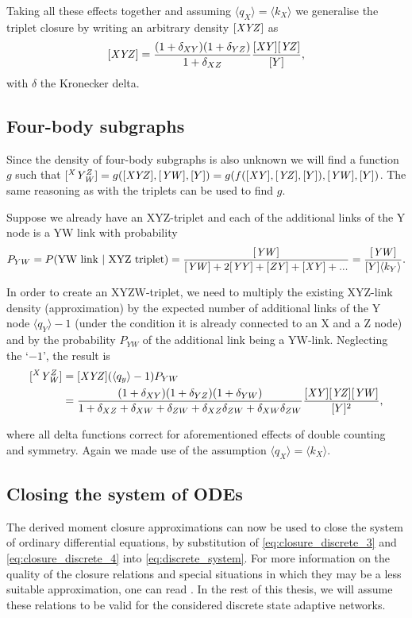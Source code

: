 Taking all these effects together and assuming $\langle q_X \rangle=\langle k_X \rangle$ we generalise the triplet closure by writing an arbitrary density $\mathit{[XYZ]}$ as 
\begin{equation}
	\mathit{[XYZ]} = \frac{(1+\delta_{XY})(1+\delta_{YZ})}{1+\delta_{XZ}} \frac{\mathit{[XY]}\mathit{[YZ]}}{[Y]},
	\label{eq:closure_discrete_3}
\end{equation}
with $\delta$ the Kronecker delta.

\subsection{Four-body subgraphs}
Since the density of four-body subgraphs is also unknown we will find a function $g$ such that $\mathit{[^XY^Z_W]} = g(\mathit{[XYZ]}, \mathit{[YW]}, [Y])= g(f(\mathit{[XY]}, \mathit{[YZ]}, [Y]), \mathit{[YW]}, [Y])$. The same reasoning as with the triplets can be used to find $g$.

Suppose we already have an XYZ-triplet and each of the additional links of the Y node is a YW link with probability 
\begin{equation}
	P_{YW}=P(\text{YW link | XYZ triplet}) = \frac{\mathit{[YW]}}{\mathit{[YW]} + 2\mathit{[YY]} + \mathit{[ZY]} + \mathit{[XY]} + ...} = \frac{\mathit{[YW]}}{[Y] \langle k_Y \rangle}.
\end{equation}

In order to create an XYZW-triplet, we need to multiply the existing XYZ-link density (approximation) by the expected number of additional links of the Y node $\langle q_Y \rangle -1$ (under the condition it is already connected to an X and a Z node) and by the probability $P_{YW}$ of the additional link being a YW-link. Neglecting the `$-1$', the result is
\begin{equation}
	\begin{aligned}
		\mathit{[^XY^Z_W]} &= \mathit{[XYZ]} (\langle q_y \rangle -1) P_{YW} \\
		&= \frac{(1+\delta_{XY})(1+\delta_{YZ})(1+\delta_{YW})}{1+\delta_{XZ}+\delta_{XW}+\delta_{ZW}+\delta_{XZ}\delta_{ZW}+\delta_{XW}\delta_{ZW}}\frac{\mathit{[XY]}\mathit{[YZ]}\mathit{[YW]}}{[Y]^2},
	\end{aligned}
	\label{eq:closure_discrete_4}
\end{equation}

where all delta functions correct for aforementioned effects of double counting and symmetry. Again we made use of the assumption $\langle q_X \rangle=\langle k_X \rangle $.


\subsection{Closing the system of ODEs}
The derived moment closure approximations can now be used to close the system of ordinary differential equations, by substitution of \cref{eq:closure_discrete_3} and \cref{eq:closure_discrete_4} into \cref{eq:discrete_system}. For more information on the quality of the closure relations and special situations in which they may be a less suitable approximation, one can read \cite{Demirel2014}. In the rest of this thesis, we will assume these relations to be valid for the considered discrete state adaptive networks.
